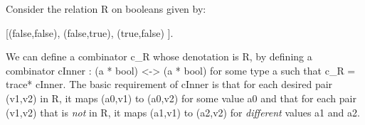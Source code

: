 \documentclass{llncs}
\begin{document}
Consider the relation {{R}} on booleans given by:

{{ {[(false,false), (false,true), (true,false) ]}. }}

\noindent We can define a combinator {{c_R}} whose denotation is {{R}}, by
defining a combinator {{cInner : (a * bool) <-> (a * bool)}} for some type
{{a}} such that {{c_R = trace* cInner}}. The basic requirement of {{cInner}}
is that for each desired pair {{(v1,v2)}} in {{R}}, it maps {{(a0,v1)}} to
{{(a0,v2)}} for some value {{a0}} and that for each pair {{(v1,v2)}} that is
\emph{not} in {{R}}, it maps {{(a1,v1)}} to {{(a2,v2)}} for \emph{different}
values {{a1}} and {{a2}}. 




\end{document}
